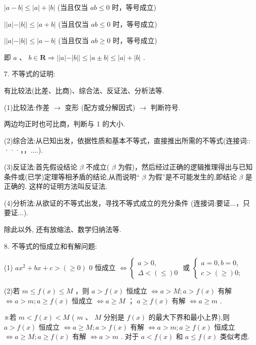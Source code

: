    $\left| {a - b}\right|  \leq  \left| a\right|  + \left| b\right|$ (当且仅当 ${ab} \leq  0$ 时，等号成立)

   $\left| \right| a\left| -\right| b\left| \right|  \leq  \left| {a + b}\right|$ (当且仅当 ${ab} \leq  0$ 时，等号成立)

   $\left| \right| a\left| -\right| b\left| \right|  \leq  \left| {a - b}\right|$ (当且仅当 ${ab} \geq  0$ 时，等号成立)

即 $a\text{ 、 }b \in  \mathbf{R} \Rightarrow  \left| \right| a\left| -\right| b\left| \right|  \leq  \left| {a \pm  b}\right|  \leq  \left| a\right|  + \left| b\right|$ .

7. 不等式的证明:

有比较法(比差、比商)、综合法、反证法、分析法等.

(1)比较法:作差 $\rightarrow$ 变形 (配方或分解因式) $\rightarrow$ 判断符号.

两边均正时也可比商，判断与 1 的大小.

(2)综合法:从已知出发，依据性质和基本不等式，直接推出所需的不等式(连接词:: ···，，....).

(3)反证法:首先假设结论 $\beta$ 不成立( $\beta$ 为假)，然后经过正确的逻辑推理得出与已知条件或(已学)定理等相矛盾的结论,从而说明“ $\beta$ 为假”是不可能发生的,即结论 $\beta$ 是正确的. 这样的证明方法叫反证法.

(4)分析法:从欲证的不等式出发，寻找不等式成立的充分条件 (连接词:要证...，只要证...).

除此以外, 还有放缩法、数学归纳法等.

8. 不等式的恒成立和有解问题:

(1) $a{x}^{2} + {bx} + c > \left( { \geq  0}\right)$ 0 恒成立 $\Leftrightarrow  \left\{  \begin{array}{l} a > 0, \\  \Delta  < \left(  \leq  \right) 0 \end{array}\right.$ 或 $\left\{  \begin{array}{l} a = 0,b = 0, \\  c > \left(  \geq  \right) 0; \end{array}\right.$

(2)若 $m \leq  f\left( x\right)  \leq  M$ ，则 $a > f\left( x\right)$ 恒成立 $\Leftrightarrow  a > M;a > f\left( x\right)$ 有解 $\Leftrightarrow  a > m;a \geq  f\left( x\right)$ 恒成立 $\Leftrightarrow  a \geq  M$ ； $a \geq  f\left( x\right)$ 有解 $\Leftrightarrow  a \geq  m$ .

※若 $m < f\left( x\right)  < M$ ( $m$ 、 $M$ 分别是 $f\left( x\right)$ 的最大下界和最小上界),则 $a > f\left( x\right)$ 恒成立 $\Leftrightarrow  a \geq  M;a >  f\left( x\right)$ 有解 $\Leftrightarrow  a > m;a \geq  f\left( x\right)$ 恒成立 $\Leftrightarrow  a \geq  M;a \geq  f\left( x\right)$ 有解 $\Leftrightarrow  a > m$ . 对于 $a < f\left( x\right)$ 和 $a \leq  f\left( x\right)$ 类似考虑.

